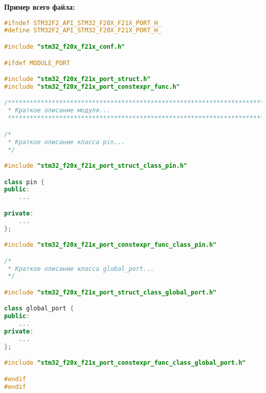 \textbf{Пример всего файла:}\begin{lstlisting}[language=C++, frame=tlBR, basicstyle=\fontsize{10}{10}\ttfamily]
#ifndef STM32F2_API_STM32_F20X_F21X_PORT_H_
#define STM32F2_API_STM32_F20X_F21X_PORT_H_

#include "stm32_f20x_f21x_conf.h"

#ifdef MODULE_PORT

#include "stm32_f20x_f21x_port_struct.h"						
#include "stm32_f20x_f21x_port_constexpr_func.h"				

/**********************************************************************
 * Краткое описание модуля...
 **********************************************************************/

/*
 * Краткое описание класса pin...
 */

#include "stm32_f20x_f21x_port_struct_class_pin.h"

class pin {
public:
	...

private:
	...
};

#include "stm32_f20x_f21x_port_constexpr_func_class_pin.h"

/*
 * Краткое описание класса global_port...
 */

#include "stm32_f20x_f21x_port_struct_class_global_port.h"		

class global_port {
public:
	...
private:
	...
};

#include "stm32_f20x_f21x_port_constexpr_func_class_global_port.h"

#endif
#endif\end{lstlisting}

